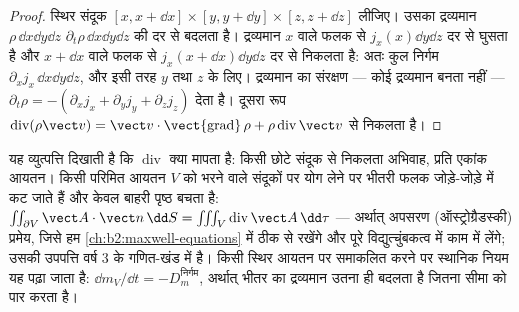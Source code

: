 \begin{proof}
स्थिर संदूक $[x, x + \dd x]\times[y, y + \dd y]\times[z, z + \dd z]$ लीजिए।
उसका द्रव्यमान $\rho\,\dd x\dd y\dd z$ $\partial_t\rho\,\dd x\dd y
\dd z$ की दर से बदलता है। द्रव्यमान $x$ वाले फलक से $j_x(x)\dd y\dd z$ दर से घुसता है
और $x + \dd x$ वाले फलक से $j_x(x + \dd x)\dd y\dd z$ दर से निकलता है:
अतः कुल निर्गम $\partial_xj_x\,\dd x\dd y\dd z$, और इसी तरह $y$ तथा $z$ के लिए।
द्रव्यमान का संरक्षण --- कोई द्रव्यमान बनता नहीं --- $\partial_t\rho = -
(\partial_xj_x + \partial_yj_y + \partial_zj_z)$ देता है। दूसरा रूप
$\operatorname{div}(\rho\vect v) = \vect v\cdot\operatorname{\vect{grad}}\rho +
\rho\operatorname{div}\vect v$ से निकलता है।
\end{proof}

\begin{remark}\label{rem:b2:fluid-kinematics:divergence}
यह व्युत्पत्ति दिखाती है कि $\operatorname{div}$ क्या मापता है: किसी छोटे
संदूक से निकलता अभिवाह, प्रति एकांक आयतन। किसी परिमित आयतन $V$ को
भरने वाले संदूकों पर योग लेने पर भीतरी फलक जोड़े-जोड़े में कट जाते हैं और
केवल बाहरी पृष्ठ बचता है: $\iint_{\partial V}\vect A\cdot\vect n\,\dd S = \iiint_V
\operatorname{div}\vect A\,\dd\tau$ --- अर्थात् अपसरण (ऑस्ट्रोग्रैडस्की)
प्रमेय, जिसे हम \cref{ch:b2:maxwell-equations} में ठीक से रखेंगे
और पूरे विद्युत्चुंबकत्व में काम में लेंगे; उसकी उपपत्ति वर्ष 3 के
गणित-खंड में है। किसी स्थिर आयतन पर समाकलित करने पर स्थानिक नियम यह पढ़ा जाता है:
$\dd m_V/\dd t = -D_m^{\text{निर्गम}}$, अर्थात् भीतर का द्रव्यमान उतना ही
बदलता है जितना सीमा को पार करता है।
\end{remark}


